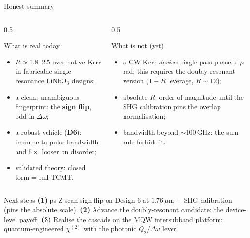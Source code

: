 \documentclass[aspectratio=169,10pt]{beamer}
\newcommand{\chitwo}{\chi^{(2)}}
\newcommand{\Dom}{\Delta\omega}
\begin{document}
\begin{frame}{Honest summary}
  \begin{columns}[T]
    \begin{column}{0.5\linewidth}
      \small
      \begin{block}{What is real today}
        \begin{itemize}\setlength\itemsep{1pt}
          \item $R \approx 1.8$--$2.5$ over native Kerr in fabricable single-resonance
                LiNbO$_3$ designs;
          \item a clean, unambiguous fingerprint: the \textbf{sign flip}, odd in $\Dom$;
          \item a robust vehicle (\textcolor{d6}{\textbf{D6}}): immune to pulse
                bandwidth and $5\times$ looser on disorder;
          \item validated theory: closed form = full TCMT.
        \end{itemize}
      \end{block}
    \end{column}
    \begin{column}{0.5\linewidth}
      \small
      \begin{block}{What is not (yet)}
        \begin{itemize}\setlength\itemsep{1pt}
          \item a CW Kerr \emph{device}: single-pass phase is $\mu$rad; this requires
                the doubly-resonant version ($1{+}R$ leverage, $R\sim12$);
          \item absolute $R$: order-of-magnitude until the SHG calibration pins the
                overlap normalisation;
          \item bandwidth beyond $\sim$100\,GHz: the sum rule forbids it.
        \end{itemize}
      \end{block}
    \end{column}
  \end{columns}
  \vspace{4pt}
  \begin{alertblock}{Next steps}
    \small
    \textbf{(1)} ps Z-scan sign-flip on Design 6 at $1.76\,\mu$m + SHG calibration
    (pins the absolute scale).
    \textbf{(2)} Advance the doubly-resonant candidate: the device-level payoff.
    \textbf{(3)} Realise the cascade on the MQW intersubband platform:
    quantum-engineered $\chitwo$ with the photonic $Q_2/\Dom$ lever.
  \end{alertblock}
\end{frame}
\end{document}
